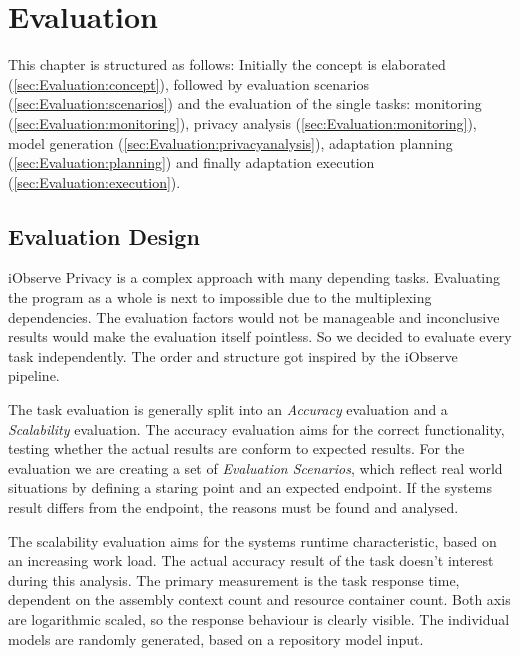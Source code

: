 
\chapter{Evaluation}
\label{ch:Evaluation}

This chapter is structured as follows: Initially the concept is elaborated (\autoref{sec:Evaluation:concept}), followed by evaluation scenarios (\autoref{sec:Evaluation:scenarios}) and the evaluation of the single tasks: monitoring (\autoref{sec:Evaluation:monitoring}), privacy analysis (\autoref{sec:Evaluation:monitoring}), model generation (\autoref{sec:Evaluation:privacyanalysis}), adaptation planning (\autoref{sec:Evaluation:planning}) and finally adaptation execution (\autoref{sec:Evaluation:execution}).

\section{Evaluation Design}
\label{sec:Evaluation:concept}

iObserve Privacy is a complex approach with many depending tasks. Evaluating the program as a whole is next to impossible due to the multiplexing dependencies. The evaluation factors would not be manageable and inconclusive results would make the evaluation itself pointless. So we decided to evaluate every task independently. The order and structure got inspired by the iObserve pipeline.

The task evaluation is generally split into an \textit{Accuracy} evaluation and a \textit{Scalability} evaluation. The accuracy evaluation aims for the correct functionality, testing whether the actual results are conform to expected results. For the evaluation we are creating a set of \textit{Evaluation Scenarios}, which reflect real world situations by defining a staring point and an expected endpoint. If the systems result differs from the endpoint, the reasons must be found and analysed.

The scalability evaluation aims for the systems runtime characteristic, based on an increasing work load. The actual accuracy result of the task doesn't interest during this analysis. The primary measurement is the task response time, dependent on the assembly context count and resource container count. Both axis are logarithmic scaled, so the response behaviour is clearly visible. The individual models are randomly generated, based on a repository model input.

